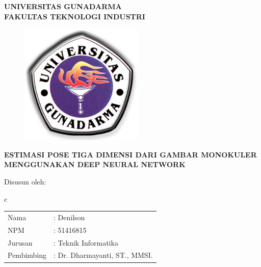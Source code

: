 \newpage


\begin{center}
  \bfseries
  UNIVERSITAS GUNADARMA\\
  FAKULTAS TEKNOLOGI INDUSTRI\\
\end{center}

\begin{center}

  \vspace{1.5cm}

  \begin{figure}[h]
    \begin{center}
      \includegraphics[scale=5]{gambar/LogoGunadarma.jpg}
    \end{center}
  \end{figure}

  \vspace{1.0cm}

  \bfseries
  ESTIMASI POSE TIGA DIMENSI DARI GAMBAR MONOKULER MENGGUNAKAN DEEP NEURAL NETWORK
\end{center}

\vspace{1.0cm}
\begin{center}
  Disusun oleh:             \\
\end{center}
\vspace{0.2cm}

\begin{center}
  \begin{tabular}{c}
    \begin{tabular}{ll}
      Nama       & : Denilson                    \\[-5pt]
      NPM        & : 51416815                    \\[-5pt]
      Jurusan    & : Teknik Informatika          \\[-5pt]
      Pembimbing & : Dr. Dharmayanti, ST., MMSI. \\
    \end{tabular} \\
  \end{tabular}
\end{center}


